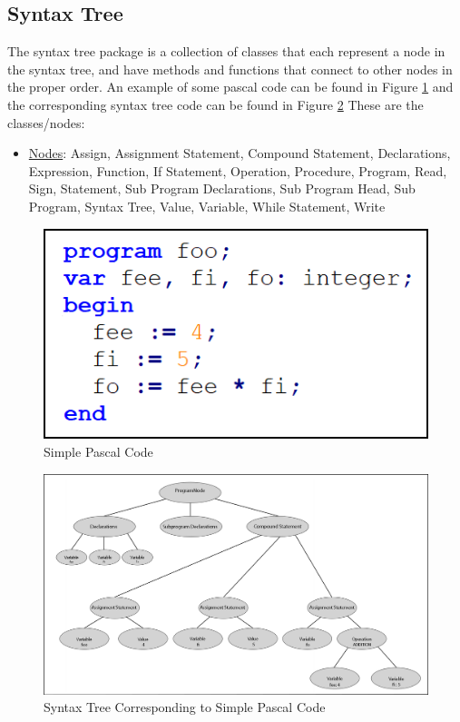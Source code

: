 \documentclass[english]{article}
\begin{document}
\subsection{Syntax Tree}

The syntax tree package is a collection of classes that each represent a node in the syntax tree, and have methods and functions that connect to other nodes in the proper order. An example of some pascal code can be found in Figure \ref{Tree Code} and the corresponding syntax tree code can be found in Figure  \ref{Syntax Tree} These are the classes/nodes:

\begin{itemize}
\item
\underline{Nodes}: Assign, Assignment Statement, Compound Statement, Declarations, Expression, Function, If Statement, Operation, Procedure, Program, Read, Sign, Statement, Sub Program Declarations, Sub Program Head, Sub Program, Syntax Tree, Value, Variable, While Statement, Write
\end{itemize}



\begin{figure}
\begin{center}
\includegraphics[width=.8\textwidth]{tree_code.PNG}
\end{center}
\caption{\label{Tree Code}Simple Pascal Code}
\end{figure}

\begin{figure}
\begin{center}
\includegraphics[width=1\textwidth]{syntax_tree.PNG}
\end{center}
\caption{\label{Syntax Tree}Syntax Tree Corresponding to Simple Pascal Code}
\end{figure}
\end{document}
